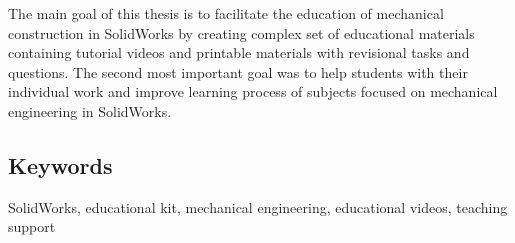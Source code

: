 \documentclass{template/socthesis}
\begin{document}
The main goal of this thesis is to facilitate the education of mechanical construction in SolidWorks by creating complex set of educational materials containing tutorial videos and printable materials with revisional tasks and questions.
The second most important goal was to help students with their individual work and improve learning process of subjects focused on mechanical engineering in SolidWorks. 

\subsection*{Keywords}
SolidWorks, educational kit, mechanical engineering, educational videos, teaching support

\newpage
\pagestyle{plain}

\setlength{\parskip}{0em}
\tableofcontents %

\setlength{\parskip}{0.8em}
\setcounter{figure}{0}
\setcounter{table}{0}
\newpage







\newpage

\appendix
{}



\setlength{\parskip}{0em}
\printbibliography[title=Literatura]

\listoffigures \label{listoffigures}

\end{document}
